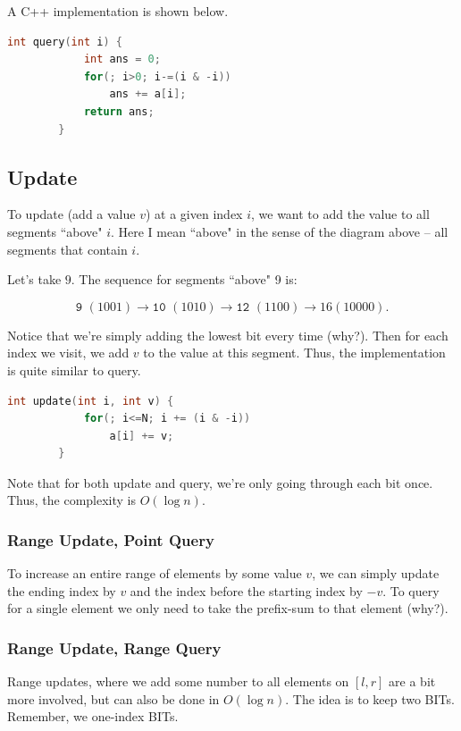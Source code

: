 \documentclass{article}
\begin{document}
        
       \vspace{5pt}\noindent A C++ implementation is shown below.
        \begin{lstlisting}[language=C++]
        int query(int i) {
            int ans = 0;
            for(; i>0; i-=(i & -i))
                ans += a[i];
            return ans;
        }
        \end{lstlisting}
        
    \subsection{Update}
        \noindent To update (add a value $v$) at a given index $i$, we want to add the value to all segments ``above" $i$. Here I mean ``above" in the sense of the diagram above -- all segments that contain $i$.
        
        \vspace{5pt}\noindent Let's take $9$. The sequence for segments ``above" 9 is:
        
            $$ \texttt{9 }(1001)\rightarrow \texttt{10 }(1010) \rightarrow \texttt{12 }(1100) \rightarrow{16} (10000). $$
            
        \noindent Notice that we're simply adding the lowest bit every time (why?). Then for each index we visit, we add $v$ to the value at this segment. Thus, the implementation is quite similar to query. 
        \begin{lstlisting}[language=C++]
        int update(int i, int v) {
            for(; i<=N; i += (i & -i))
                a[i] += v;
        }
        \end{lstlisting}
        
    Note that for both update and query, we're only going through each bit once. Thus, the complexity is $O(\log n)$.
    
    \subsubsection{Range Update, Point Query}
    
    \noindent To increase an entire range of elements by some value $v$, we can simply update the ending index by $v$ and the index before the starting index by $-v$. To query for a single element we only need to take the prefix-sum to that element (why?). 
    \subsubsection{Range Update, Range Query}
        Range updates, where we add some number to all elements on $[l,r]$ are a bit more involved, but can also be done in $O(\log n)$. The idea is to keep two BITs. Remember, we one-index BITs.
        
\end{document}
